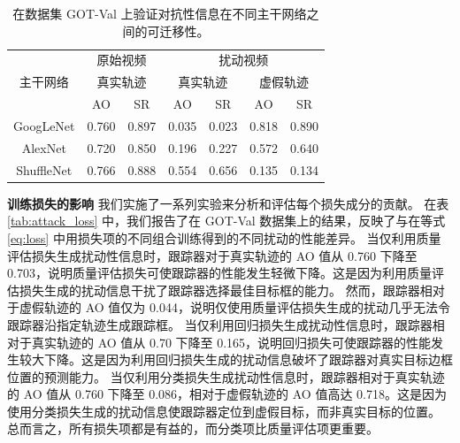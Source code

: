 \begin{table}[t]
\centering
\caption{在数据集 GOT-Val 上验证对抗性信息在不同主干网络之间的可迁移性。}
\begin{tabular}{c cc cc cc} 
\toprule
\multirow{3}{*}[-6pt]{主干网络} & \multicolumn{2}{c}{原始视频}    & \multicolumn{4}{c}{扰动视频}                                        \\ 
\cmidrule(lr){2-3} \cmidrule(lr){4-7}
                          & \multicolumn{2}{c}{真实轨迹} & \multicolumn{2}{c}{真实轨迹} & \multicolumn{2}{c}{虚假轨迹}  \\ 
\cmidrule(lr){2-3} \cmidrule(lr){4-7}
                          & AO    & SR                           & AO    & SR                           & AO    & SR                           \\ 
\midrule
GoogLeNet                 & 0.760 & 0.897                        & 0.035 & 0.023                        & 0.818 & 0.890                        \\
AlexNet                   & 0.720 & 0.850                        & 0.196 & 0.227                        & 0.572 & 0.640                        \\
ShuffleNet                & 0.766 & 0.888                        & 0.554 & 0.656                        & 0.135 & 0.134                        \\
\bottomrule
\end{tabular}
\label{tab:backbone}
\end{table}

\textbf{训练损失的影响} 我们实施了一系列实验来分析和评估每个损失成分的贡献。
在表 \ref{tab:attack_loss} 中，我们报告了在 GOT-Val 数据集上的结果，反映了与在等式 \ref{eq:loss} 中用损失项的不同组合训练得到的不同扰动的性能差异。
当仅利用质量评估损失生成扰动性信息时，跟踪器对于真实轨迹的 AO 值从 0.760 下降至 0.703，说明质量评估损失可使跟踪器的性能发生轻微下降。这是因为利用质量评估损失生成的扰动信息干扰了跟踪器选择最佳目标框的能力。
然而，跟踪器相对于虚假轨迹的 AO 值仅为 0.044，说明仅使用质量评估损失生成的扰动几乎无法令跟踪器沿指定轨迹生成跟踪框。
当仅利用回归损失生成扰动性信息时，跟踪器相对于真实轨迹的 AO 值从 0.70 下降至 0.165，说明回归损失可使跟踪器的性能发生较大下降。这是因为利用回归损失生成的扰动信息破坏了跟踪器对真实目标边框位置的预测能力。
当仅利用分类损失生成扰动性信息时，跟踪器相对于真实轨迹的 AO 值从 0.760 下降至 0.086，相对于虚假轨迹的 AO 值高达 0.718。这是因为使用分类损失生成的扰动信息使跟踪器定位到虚假目标，而非真实目标的位置。
总而言之，所有损失项都是有益的，而分类项比质量评估项更重要。

